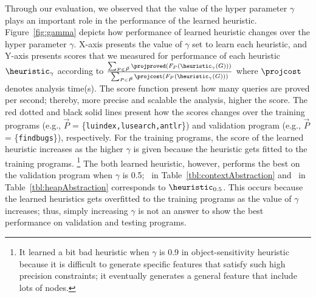 


Through our evaluation, we observed that the value of the hyper parameter $\gamma$ plays an important role in the performance of the learned heuristic.
Figure~\ref{fig:gamma} depicts how performance of learned heuristic changes over the hyper parameter $\gamma$.
X-axis presents the value of $\gamma$ set to learn each heuristic, and 
Y-axis presents scores that we measured for performance of each heuristic $\heuristic_{\gamma}$ according to
${\sum_{P\in\vec{P}}\projproved(F_P(\heuristic_{\gamma}(G)))}\over{\sum_{P\in\vec{P}}
  \projcost(F_P(\heuristic_{\gamma}(G)))}$ where $\projcost$ denotes analysis time(s). 
The score function present how many queries are proved per second; thereby, more precise and scalable the analysis,
higher the score.
The red dotted and black solid lines present how the scores changes over
the training programs (e.g., $\vec{P}$ = \{{\tt luindex,lusearch,antlr}\}) and validation program (e.g., $\vec{P}$ =
\{{\tt findbugs}\}), respectively.  
For the training programs, the score of the learned heuristic
increases as the higher $\gamma$ is given because the heuristic gets
fitted to the training programs.
\footnote{It learned a bit bad heuristic when $\gamma$ is 0.9 in
  object-sensitivity heuristic because it is
difficult to generate specific features that satisfy such high precision
constraints; it eventually generates a general feature that include lots
of nodes.} 
The both learned heuristic, however, performs the best on the validation program when $\gamma$ is 0.5; 
\OurCtx~in Table~\ref{tbl:contextAbstraction} and \OurHeap~in Table~\ref{tbl:heapAbstraction}  corresponds to $\heuristic_{0.5}$. 
This occurs because the learned heuristics gets overfitted to the training programs as the value of $\gamma$ increases;
thus, simply increasing $\gamma$ is not an answer to show the best performance on validation and testing programs.


